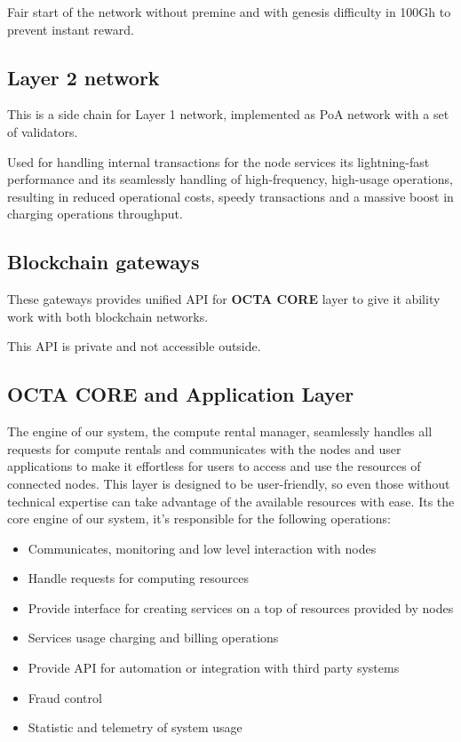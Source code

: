 Fair start of the network without premine and with genesis difficulty in 100Gh to prevent instant reward.

\subsection{Layer 2 network}

This is a side chain for Layer 1 network, implemented as PoA\cite{poa} network with a set of validators.

Used for handling internal transactions for the node services its lightning-fast performance and its seamlessly handling of high-frequency, high-usage operations,
resulting in reduced operational costs, speedy transactions and a massive boost in charging operations throughput.

\subsection{Blockchain gateways}

These gateways provides unified API for \textbf{OCTA CORE} layer to give it ability work with both blockchain networks.

This API is private and not accessible outside.

\subsection{OCTA CORE and Application Layer}
The engine of our system, the compute rental manager, seamlessly handles all requests for compute rentals and communicates with the nodes and user applications to make it effortless for users to access and use the resources of connected nodes. This layer is designed to be user-friendly, so even those without technical expertise can take advantage of the available resources with ease. 
Its the core engine of our system, it's responsible for the following operations:

\begin{itemize}
    \item Communicates, monitoring and low level interaction with nodes
    \item Handle requests for computing resources
    \item Provide interface for creating services on a top of resources provided by nodes
    \item Services usage charging and billing operations
    \item Provide API for automation or integration with third party systems
    \item Fraud control
    \item Statistic and telemetry of system usage
\end{itemize}

